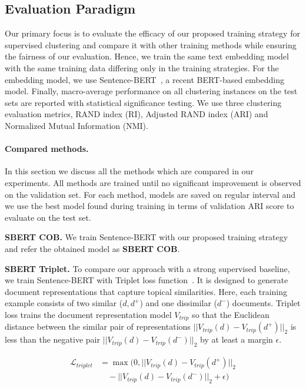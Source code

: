 \documentclass[11pt,a4paper]{article}
\begin{document}
\subsection{Evaluation Paradigm} Our primary focus is to evaluate the efficacy of our proposed training strategy for supervised clustering and compare it with other training methods while ensuring the fairness of our evaluation. Hence, we train the same text embedding model with the same training data differing only in the training strategies. For the embedding model, we use Sentence-BERT~\citep{reimers2019sentence}, a recent BERT-based embedding model. Finally, macro-average performance on all clustering instances on the test sets are reported with statistical significance testing. We use three clustering evaluation metrics, RAND index (RI), Adjusted RAND index (ARI) and Normalized Mutual Information (NMI).

\paragraph{Compared methods.} In this section we discuss all the methods which are compared in our experiments. All methods are trained until no significant improvement is observed on the validation set. For each method, models are saved on regular interval and we use the best model found during training in terms of validation ARI score to evaluate on the test set.

\textbf{SBERT COB.} We train Sentence-BERT with our proposed training strategy and refer the obtained model as \textbf{SBERT COB}.

\textbf{SBERT Triplet.} To compare our approach with a strong supervised baseline, we train Sentence-BERT with Triplet loss function~\citep{dor2018learning}. It is designed to generate document representations that capture topical similarities. Here, each training example consists of two similar ($d,d^+$) and one dissimilar ($d^-$) documents. Triplet loss trains the document representation model $V_{trip}$ so that the Euclidean distance between the similar pair of representations $||V_{trip}(d)-V_{trip}(d^+)||_2$ is less than the negative pair $||V_{trip}(d)-V_{trip}(d^-)||_2$ by at least a margin $\epsilon$.

\begin{align*}
    \mathcal{L}_{triplet} &= \max(0, ||V_{trip}(d)-V_{trip}(d^+)||_2 \\
    & \quad -||V_{trip}(d)-V_{trip}(d^-)||_2+\epsilon)
\end{align*}
\end{document}
